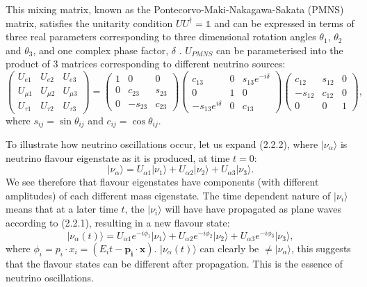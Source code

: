 \documentclass[11pt]{article}
\newcommand{\ket}[1]{\lvert #1 \rangle}
\newcommand{\mathds}[1]{\mathbb{#1}}
\begin{document}
This mixing matrix, known as the Pontecorvo-Maki-Nakagawa-Sakata (PMNS) matrix, satisfies the unitarity condition $ UU^{\dagger} = \mathds{1} $ and can be expressed in terms of three real parameters corresponding to three dimensional rotation angles $\theta_1$, $\theta_2$ and $\theta_3$, and one complex phase factor, $\delta$ \cite{Thomson}. $U_{PMNS}$ can be parameterised into the product of 3 matrices corresponding to different neutrino sources:
\begin{equation}
    \begin{pmatrix}
        U_{e1} & U_{e2} & U_{e3} \\ U_{\mu 1} & U_{\mu 2} & U_{\mu 3} \\ U_{\tau 1} & U_{\tau 2} & U_{\tau 3}
    \end{pmatrix}
    = \begin{pmatrix}
        1 & 0 & 0 \\ 0 & c_{23} & s_{23} \\ 0 & -s_{23} & c_{23}
    \end{pmatrix}
\begin{pmatrix}
    c_{13} & 0 & s_{13}e^{-i\delta} \\ 0 & 1 & 0 \\ -s_{13}e^{i \delta} & 0 & c_{13}
\end{pmatrix}    
\begin{pmatrix}
    c_{12} & s_{12} & 0 \\ -s_{12} & c_{12} & 0  \\ 0& 0& 1
\end{pmatrix},
\end{equation}
where $s_{ij} = \sin\theta_{ij}$ and $c_{ij} = \cos\theta_{ij}$. 


To illustrate how neutrino oscillations occur, let us expand (2.2.2), where $\ket{\nu_{\alpha}}$ is neutrino flavour eigenstate as it is produced, at time $t=0$:
\begin{equation}
    \ket{\nu_{\alpha}} = U_{\alpha1}\ket{\nu_1} + U_{\alpha2}\ket{\nu_2} + U_{\alpha3}\ket{\nu_3}.
\end{equation}
We see therefore that flavour eigenstates have components (with different amplitudes) of each different mass eigenstate. The time dependent nature of $\ket{\nu_i}$ means that at a later time $t$, the $\ket{\nu_i}$ will have have propagated as plane waves according to (2.2.1), resulting in a new flavour state:
\begin{equation}
    \ket{\nu_{\alpha}(t)} = U_{\alpha1}e^{-i\phi_1}\ket{\nu_1}+ U_{\alpha2}e^{-i\phi_2}\ket{\nu_2} + U_{\alpha3}e^{-i\phi_3}\ket{\nu_3},
\end{equation}
where $\phi_i = p_i \cdot x_i = (E_it - \mathbf{p_i} \cdot \mathbf{x}).$ $\ket{\nu_{\alpha}(t)}$ can clearly be $\neq \ket{\nu_{\alpha}}$, this suggests that the flavour states can be different after propagation. This is the essence of neutrino oscillations. 
\end{document}
